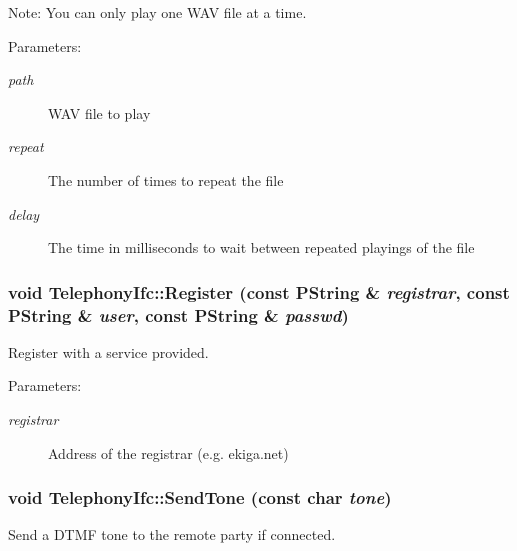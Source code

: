 \begin{Desc}
\item[Note:]You can only play one WAV file at a time. \end{Desc}
\begin{Desc}
\item[Parameters:]
\begin{description}
\item[{\em path}]WAV file to play \item[{\em repeat}]The number of times to repeat the file \item[{\em delay}]The time in milliseconds to wait between repeated playings of the file \end{description}
\end{Desc}
\hypertarget{classTelephonyIfc_ddbfc63168d5e70fd4f83469de4aabb7}{
\subsubsection[{Register}]{\setlength{\rightskip}{0pt plus 5cm}void TelephonyIfc::Register (const PString \& {\em registrar}, \/  const PString \& {\em user}, \/  const PString \& {\em passwd})}}
\label{classTelephonyIfc_ddbfc63168d5e70fd4f83469de4aabb7}


Register with a service provided. 

\begin{Desc}
\item[Parameters:]
\begin{description}
\item[{\em registrar}]Address of the registrar (e.g. ekiga.net) \end{description}
\end{Desc}
\hypertarget{classTelephonyIfc_ac6179d75a2c623e05ccb345b45741f1}{
\subsubsection[{SendTone}]{\setlength{\rightskip}{0pt plus 5cm}void TelephonyIfc::SendTone (const char {\em tone})}}
\label{classTelephonyIfc_ac6179d75a2c623e05ccb345b45741f1}


Send a DTMF tone to the remote party if connected. 

